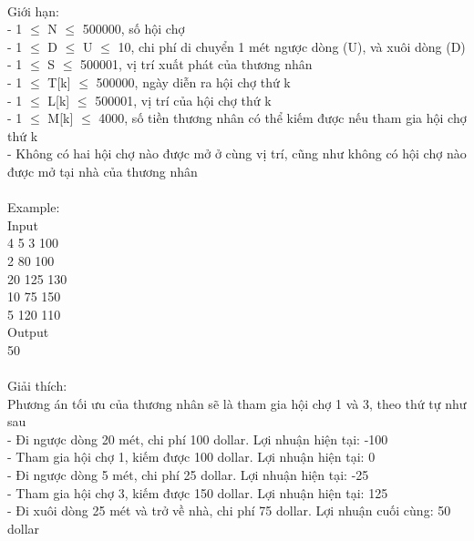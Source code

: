 \\   Giới hạn:   
\\   - 1  $\le$  N  $\le$  500000, số hội chợ   
\\   - 1  $\le$  D  $\le$  U  $\le$  10, chi phí di chuyển 1 mét ngược dòng (U), và xuôi dòng (D)   
\\   - 1  $\le$  S  $\le$  500001, vị trí xuất phát của thương nhân   
\\   - 1  $\le$  T[k]  $\le$  500000, ngày diễn ra hội chợ thứ k   
\\   - 1  $\le$  L[k]  $\le$  500001, vị trí của hội chợ thứ k   
\\   - 1  $\le$  M[k]  $\le$  4000, số tiền thương nhân có thể kiếm được nếu tham gia hội chợ thứ k   
\\   - Không có hai hội chợ nào được mở ở cùng vị trí, cũng như không có hội chợ nào được mở tại nhà của thương nhân   
\\
\\   Example:   
\\   Input   
\\   4 5 3 100   
\\   2 80 100   
\\   20 125 130   
\\   10 75 150   
\\   5 120 110   
\\   Output   
\\   50   
\\
\\   Giải thích:   
\\   Phương án tối ưu của thương nhân sẽ là tham gia hội chợ 1 và 3, theo thứ tự như sau   
\\   - Đi ngược dòng 20 mét, chi phí 100 dollar. Lợi nhuận hiện tại: -100   
\\   - Tham gia hội chợ 1, kiếm được 100 dollar. Lợi nhuận hiện tại: 0   
\\   - Đi ngược dòng 5 mét, chi phí 25 dollar. Lợi nhuận hiện tại: -25   
\\   - Tham gia hội chợ 3, kiếm được 150 dollar. Lợi nhuận hiện tại: 125   
\\   - Đi xuôi dòng 25 mét và trở về nhà, chi phí 75 dollar. Lợi nhuận cuối cùng: 50 dollar  
